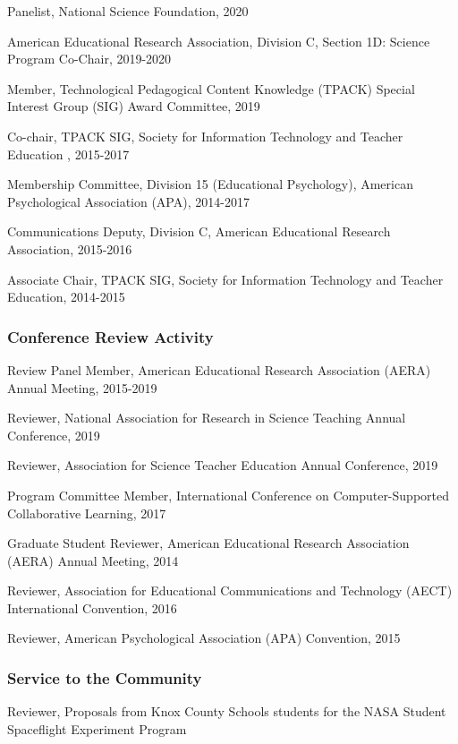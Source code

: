 \documentclass[14,]{article}
\begin{document}
Panelist, National Science Foundation, 2020

American Educational Research Association, Division C, Section 1D:
Science Program Co-Chair, 2019-2020

Member, Technological Pedagogical Content Knowledge (TPACK) Special
Interest Group (SIG) Award Committee, 2019

Co-chair, TPACK SIG, Society for Information Technology and Teacher
Education , 2015-2017

Membership Committee, Division 15 (Educational Psychology), American
Psychological Association (APA), 2014-2017

Communications Deputy, Division C, American Educational Research
Association, 2015-2016

Associate Chair, TPACK SIG, Society for Information Technology and
Teacher Education, 2014-2015

\hypertarget{conference-review-activity}{%
\subsubsection{Conference Review
Activity}\label{conference-review-activity}}

Review Panel Member, American Educational Research Association (AERA)
Annual Meeting, 2015-2019

Reviewer, National Association for Research in Science Teaching Annual
Conference, 2019

Reviewer, Association for Science Teacher Education Annual Conference,
2019

Program Committee Member, International Conference on Computer-Supported
Collaborative Learning, 2017

Graduate Student Reviewer, American Educational Research Association
(AERA) Annual Meeting, 2014

Reviewer, Association for Educational Communications and Technology
(AECT) International Convention, 2016

Reviewer, American Psychological Association (APA) Convention, 2015

\hypertarget{service-to-the-community}{%
\subsubsection{Service to the
Community}\label{service-to-the-community}}

Reviewer, Proposals from Knox County Schools students for the NASA
Student Spaceflight Experiment Program
\end{document}
